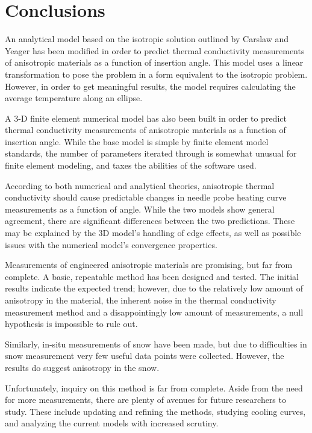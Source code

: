 \chapter{Conclusions}

An analytical model based on the isotropic solution outlined by
Carslaw and Yeager has been modified in order to predict thermal conductivity
measurements of anisotropic materials as a function of insertion angle.  This
model uses a linear transformation to pose the problem in a form equivalent to
the isotropic problem. However, in order to get meaningful results, the model
requires calculating the average temperature along an ellipse.

A 3-D finite element numerical model has also been built in order to predict
thermal conductivity measurements  of anisotropic materials as a function of
insertion angle. While the base model is simple by finite element model
standards, the number of parameters iterated through is somewhat unusual for
finite element modeling, and taxes the abilities of the software used.

According to both numerical and analytical theories, anisotropic thermal
conductivity should cause predictable changes in needle probe heating curve
measurements as a function of angle. While the two models show general
agreement, there are significant differences between the two predictions. These
may be explained by the 3D model's handling of edge effects, as well as possible
issues with the numerical model's convergence properties.

Measurements of engineered anisotropic materials are promising, but far from
complete. A basic, repeatable method has been designed and tested. The initial
results indicate the expected trend; however, due to the relatively low
amount of anisotropy in the material, the inherent noise in the thermal
conductivity measurement method and a disappointingly low amount of
measurements, a null hypothesis is impossible to rule out.

Similarly, in-situ measurements of snow have been made, but due to difficulties
in snow measurement very few useful data points were collected. However, the
results do suggest anisotropy in the snow.

Unfortunately, inquiry on this method is far from complete. Aside from the need
for more measurements, there are plenty of avenues for future researchers to
study. These include updating and refining the methods, studying cooling curves,
and analyzing the current models with increased scrutiny.
